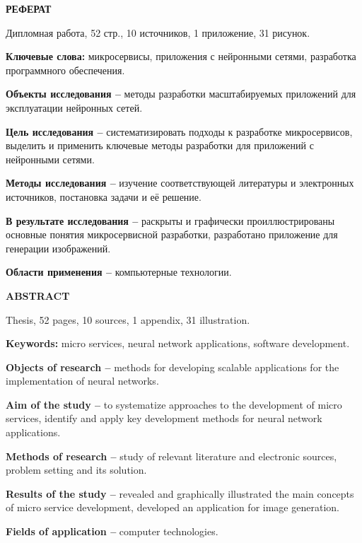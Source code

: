 \begin{center}
  \large\bfseries{РЕФЕРАТ}
\end{center}

Дипломная работа, 52 стр., 10 источников, 1 приложение, 31 рисунок.

\textbf{Ключевые слова:} микросервисы, приложения с нейронными сетями, разработка программного обеспечения.

\textbf{Объекты исследования --} методы разработки масштабируемых приложений для эксплуатации нейронных сетей.

\textbf{Цель исследования --} систематизировать подходы к разработке микросервисов, выделить и применить ключевые методы разработки для приложений с нейронными сетями.

\textbf{Методы исследования --} изучение соответствующей литературы и электронных источников, постановка задачи и её решение.

\textbf{В результате исследования --} раскрыты и графически проиллюстрированы основные понятия микросервисной разработки, разработано приложение для генерации изображений.

\textbf{Области применения --} компьютерные технологии.

\newpage

\begin{center}
  \large\bfseries{ABSTRACT}
\end{center}

Thesis, 52 pages, 10 sources, 1 appendix, 31 illustration.

\textbf{Keywords:} micro services, neural network applications, software development.

\textbf{Objects of research --} methods for developing scalable applications for the implementation of neural networks.

\textbf{Aim of the study --} to systematize approaches to the development of micro services, identify and apply key development methods for neural network app\-lications.

\textbf{Methods of research --} study of relevant literature and electronic sources, problem setting and its solution.

\textbf{Results of the study --} revealed and graphically illustrated the main concepts of micro service development, developed an application for image generation.

\textbf{Fields of application --} computer technologies.

\newpage

